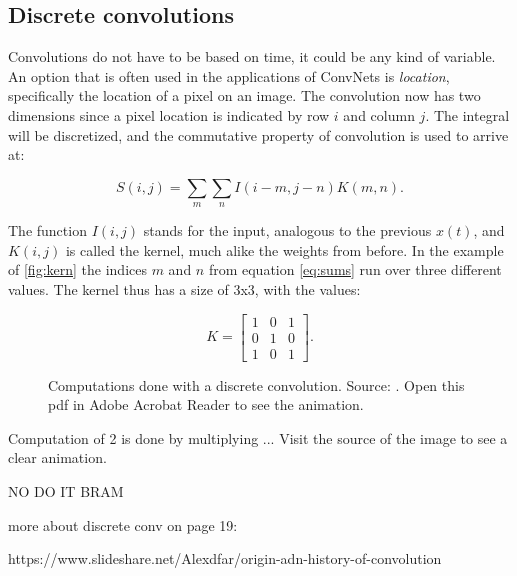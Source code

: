 \subsection{Discrete convolutions}

Convolutions do not have to be based on time, it could be any kind of variable. An option that is often used in the applications of ConvNets is \textit{location}, specifically the location of a pixel on an image. The convolution now has two dimensions since a pixel location is indicated by row $i$ and column $j$. The integral will be discretized, and the commutative property of convolution is used to arrive at:

\begin{equation}\label{eq:sums}
    S(i,j) = \sum_m \sum_n I(i-m,j-n)K(m,n).
\end{equation}

The function $I(i,j)$ stands for the input, analogous to the previous $x(t)$, and $K(i,j)$ is called the kernel, much alike the weights from before. In the example of \autoref{fig:kern} the indices $m$ and $n$ from equation \eqref{eq:sums} run over three different values. The kernel thus has a size of 3x3, with the values:

\begin{equation*}
    K = 
    \begin{bmatrix}
        1 & 0 & 1 \\
        0 & 1 & 0 \\
        1 & 0 & 1 
    \end{bmatrix}.
\end{equation*}

\begin{figure}
    \centering
    \caption{Computations done with a discrete convolution. Source: \cite{stanf}. Open this pdf in Adobe Acrobat Reader to see the animation.}
    \label{fig:kern}
\end{figure}




Computation of 2 is done by multiplying ...
Visit the source of the image to see a clear animation.

NO DO IT BRAM








more about discrete conv on page 19:

https://www.slideshare.net/Alexdfar/origin-adn-history-of-convolution










